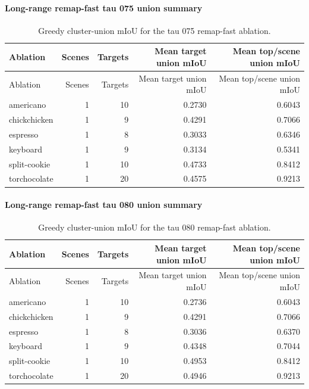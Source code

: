 \documentclass[10pt]{article}
\begin{document}
\paragraph{Long-range remap-fast tau 075 union summary}
\small
\begin{longtable}{lrrrr}
\caption{Greedy cluster-union mIoU for the tau 075 remap-fast ablation.}\\
\toprule
Ablation & Scenes & Targets & Mean target union mIoU & Mean top/scene union mIoU \\
\midrule
\endfirsthead
\toprule
Ablation & Scenes & Targets & Mean target union mIoU & Mean top/scene union mIoU \\
\midrule
\endhead
americano & 1 & 10 & 0.2730 & 0.6043 \\
chickchicken & 1 & 9 & 0.4291 & 0.7066 \\
espresso & 1 & 8 & 0.3033 & 0.6346 \\
keyboard & 1 & 9 & 0.3134 & 0.5341 \\
split-cookie & 1 & 10 & 0.4733 & 0.8412 \\
torchocolate & 1 & 20 & 0.4575 & 0.9213 \\
\bottomrule
\end{longtable}
\normalsize

\paragraph{Long-range remap-fast tau 080 union summary}
\small
\begin{longtable}{lrrrr}
\caption{Greedy cluster-union mIoU for the tau 080 remap-fast ablation.}\\
\toprule
Ablation & Scenes & Targets & Mean target union mIoU & Mean top/scene union mIoU \\
\midrule
\endfirsthead
\toprule
Ablation & Scenes & Targets & Mean target union mIoU & Mean top/scene union mIoU \\
\midrule
\endhead
americano & 1 & 10 & 0.2736 & 0.6043 \\
chickchicken & 1 & 9 & 0.4291 & 0.7066 \\
espresso & 1 & 8 & 0.3036 & 0.6370 \\
keyboard & 1 & 9 & 0.4348 & 0.7044 \\
split-cookie & 1 & 10 & 0.4953 & 0.8412 \\
torchocolate & 1 & 20 & 0.4946 & 0.9213 \\
\bottomrule
\end{longtable}
\normalsize
\end{document}
